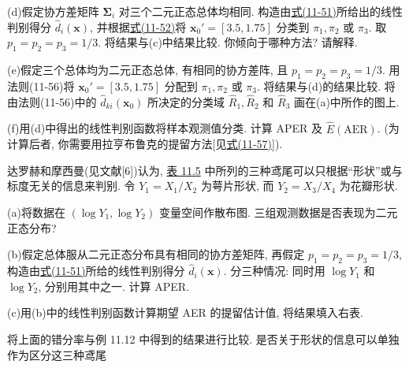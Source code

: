 \noindent (d)\quad 假定协方差矩阵 $\boldsymbol{\Sigma}_i$ 对三个二元正态总体均相同. 构造由\hyperref[eq:11-51]{式(11-51)}所给出的线性判别得分 $\hat{d}_i(\mathbf{x})$, 并根据\hyperref[eq:11-52]{式(11-52)}将 $\mathbf{x}_0'=[3.5,1.75]$ 分类到 $\pi_1,\pi_2$ 或 $\pi_3$. 取 $p_1=p_2=p_3=1/3$. 将结果与(c)中结果比较. 你倾向于哪种方法? 请解释.

\noindent (e)\quad 假定三个总体均为二元正态总体, 有相同的协方差阵, 且 $p_1=p_2=p_3=1/3$. 用法则(11-56)将 $\mathbf{x}_0'=[3.5,1.75]$ 分配到 $\pi_1,\pi_2$ 或 $\pi_3$. 将结果与(d)的结果比较. 将由法则(11-56)中的 $\hat{d}_{ki}(\mathbf{x}_0)$ 所决定的分类域 $\hat{R}_1,\hat{R}_2$ 和 $\hat{R}_3$ 画在(a)中所作的图上.

\noindent (f)\quad 用(d)中得出的线性判别函数将样本观测值分类. 计算 APER 及 $\hat{E}(\mathrm{AER})$. (为计算后者, 你需要用拉亨布鲁克的提留方法[见\hyperref[eq:11-57]{式(11-57)}]).

\quad 达罗赫和摩西曼(见文献[6])认为, \hyperref[tab:11.5]{表 11.5} 中所列的三种鸢尾可以只根据“形状”或与标度无关的信息来判别. 令 $Y_1=X_1/X_2$ 为萼片形状, 而 $Y_2=X_3/X_4$ 为花瓣形状.

\noindent (a)\quad 将数据在 $(\log Y_1,\log Y_2)$ 变量空间作散布图. 三组观测数据是否表现为二元正态分布?

\noindent (b)\quad 假定总体服从二元正态分布具有相同的协方差矩阵, 再假定 $p_1=p_2=p_3=1/3$, 构造由\hyperref[eq:11-51]{式(11-51)}所给的线性判别得分 $\hat{d}_i(\mathbf{x})$. 分三种情况: 同时用 $\log Y_1$ 和 $\log Y_2$, 分别用其中之一. 计算 APER.

\noindent (c)\quad 用(b)中的线性判别函数计算期望 AER 的提留估计值, 将结果填入右表.

\begin{mvtable}
\end{mvtable}

将上面的错分率与例 11.12 中得到的结果进行比较. 是否关于形状的信息可以单独作为区分这三种鸢尾

